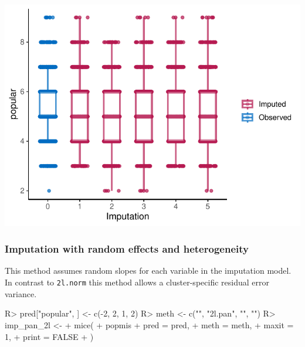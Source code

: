 \documentclass[
]{jss}
\begin{document}
\begin{CodeChunk}


\begin{center}\includegraphics{Imputation_of_Incomplete_Multilevel_Data_files/figure-latex/pop_norm_eval-1} \end{center}

\end{CodeChunk}

\hypertarget{imputation-with-random-effects-and-heterogeneity}{%
\subsubsection{Imputation with random effects and
heterogeneity}\label{imputation-with-random-effects-and-heterogeneity}}

This method assumes random slopes for each variable in the imputation
model. In contrast to \texttt{2l.norm} this method allows a
cluster-specific residual error variance.

\begin{CodeChunk}
\begin{CodeInput}
R> pred["popular", ] <- c(-2, 2, 1, 2)
R> meth <- c("", "2l.pan", "", "")
R> imp_pan_2l <-
+   mice(
+     popmis %
+     pred = pred,
+     meth = meth,
+     maxit = 1,
+     print = FALSE
+   )
\end{CodeInput}
\end{CodeChunk}
\end{document}
